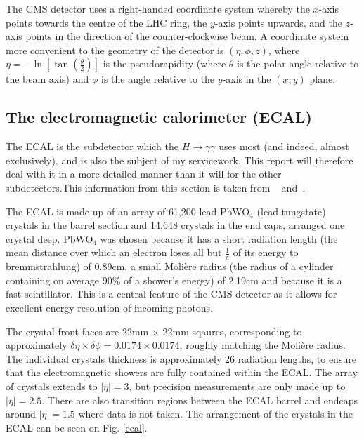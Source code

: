 \documentclass[10pt]{article}
\begin{document}
The CMS detector uses a right-handed coordinate system whereby the $x$-axis points towards the centre of the LHC ring, the $y$-axis points upwards, and the $z$-axis points in the direction of the counter-clockwise beam. A coordinate system more convenient to the geometry of the detector is $(\eta,\phi,z)$, where $\eta = -\ln [ \tan(\frac{\theta}{2})]$ is the pseudorapidity (where $\theta$ is the polar angle relative to the beam axis) and $\phi$ is the angle relative to the $y$-axis in the $(x,y)$ plane.

\subsection{The electromagnetic calorimeter (ECAL)}

The ECAL is the subdetector which the $H \rightarrow \gamma \gamma$ uses most (and indeed, almost exclusively), and is also the subject of my servicework. This report will therefore deal with it in a more detailed manner than it will for the other subdetectors.This information from this section is taken from ~\cite{CMSTDR} and~\cite{cmsEcal}.

The ECAL is made up of an array of 61,200 lead PbWO$_4$ (lead tungstate) crystals in the barrel section and 14,648 crystals in the end caps, arranged one crystal deep. PbWO$_4$ was chosen because it has a short radiation length (the mean distance over which an electron loses all but $\frac{1}{e}$ of its energy to bremmstrahlung) of 0.89cm, a small Molière radius (the radius of a cylinder containing on average 90\% of a shower's energy) of 2.19cm and because it is a fast scintillator. This is a central feature of the CMS detector as it allows for excellent energy resolution of incoming photons. 

The crystal front faces are 22mm $\times$ 22mm sqaures, corresponding to approximately $\delta \eta \times \delta \phi = 0.0174 \times 0.0174$, roughly matching the Molière radius. The individual crystals thickness is approximately 26 radiation lengths, to ensure that the electromagnetic showers are fully contained within the ECAL. The array of crystals extends to $|\eta| =3$, but precision measurements are only made up to $|\eta| =2.5$. There are also transition regions between the ECAL barrel and endcaps around $|\eta| =1.5$ where data is not taken. The arrangement of the crystals in the ECAL can be seen on Fig. \ref{ecal}.
\end{document}
